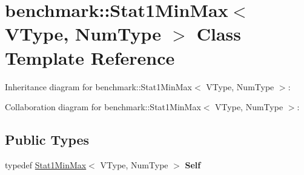 \hypertarget{classbenchmark_1_1_stat1_min_max}{}\section{benchmark\+:\+:Stat1\+Min\+Max$<$ V\+Type, Num\+Type $>$ Class Template Reference}
\label{classbenchmark_1_1_stat1_min_max}


Inheritance diagram for benchmark\+:\+:Stat1\+Min\+Max$<$ V\+Type, Num\+Type $>$\+:


Collaboration diagram for benchmark\+:\+:Stat1\+Min\+Max$<$ V\+Type, Num\+Type $>$\+:
\subsection*{Public Types}
\begin{DoxyCompactItemize}
\item 
\mbox{\label{classbenchmark_1_1_stat1_min_max_a1e568814159c98d123e3737d270f45c0}} 
typedef \mbox{\hyperlink{classbenchmark_1_1_stat1_min_max}{Stat1\+Min\+Max}}$<$ V\+Type, Num\+Type $>$ {\bfseries Self}
\end{DoxyCompactItemize}
